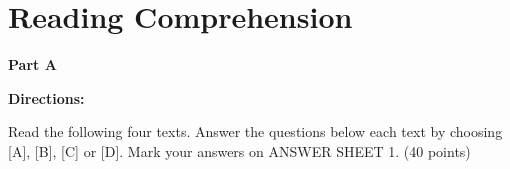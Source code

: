 
\section{Reading Comprehension}

\textbf{Part A}

\textbf{Directions:}

Read the following four texts. Answer the questions below each text by choosing [A], [B], [C] or [D]. Mark your answers on ANSWER SHEET 1. (40 points)

\vspace{6pt}